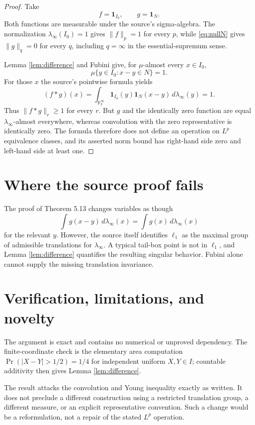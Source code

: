 \documentclass[11pt]{article}
\newcommand{\R}{\mathbb R}
\begin{document}
\begin{proof}
Take
\[
 f=\mathbf1_{I_0},\qquad g=\mathbf1_N.
\]
Both functions are measurable under the source's sigma-algebra.  The
normalization $\lambda_\infty(I_0)=1$ gives $\|f\|_p=1$ for every $p$, while
\eqref{eq:nullN} gives $\|g\|_q=0$ for every $q$, including $q=\infty$ in the
essential-supremum sense.

Lemma \ref{lem:difference} and Fubini give, for $\mu$-almost every $x\in I_0$,
\[
 \mu\{y\in I_0:x-y\in N\}=1.
\]
For those $x$ the source's pointwise formula yields
\[
 (f*g)(x)
 =\int_{\R_I^\infty}\mathbf1_{I_0}(y)\mathbf1_N(x-y)
   \,d\lambda_\infty(y)
 =1.
\]
Thus $\|f*g\|_r\geq1$ for every $r$.  But $g$ and the identically zero
function are equal $\lambda_\infty$-almost everywhere, whereas convolution
with the zero representative is identically zero.  The formula therefore
does not define an operation on $L^p$ equivalence classes, and its asserted
norm bound has right-hand side zero and left-hand side at least one.
\end{proof}

\section{Where the source proof fails}
The proof of Theorem 5.13 changes variables as though
\[
 \int g(x-y)\,d\lambda_\infty(x)=\int g(x)\,d\lambda_\infty(x)
\]
for the relevant $y$.  However, the source itself identifies $\ell_1$ as the
maximal group of admissible translations for $\lambda_\infty$.  A typical
tail-box point is not in $\ell_1$, and Lemma \ref{lem:difference} quantifies
the resulting singular behavior.  Fubini alone cannot supply the missing
translation invariance.

\section{Verification, limitations, and novelty}
The argument is exact and contains no numerical or unproved dependency.  The
finite-coordinate check is the elementary area computation
$\Pr(|X-Y|>1/2)=1/4$ for independent uniform $X,Y\in I$; countable additivity
then gives Lemma \ref{lem:difference}.

The result attacks the convolution and Young inequality exactly as written.
It does not preclude a different construction using a restricted translation
group, a different measure, or an explicit representative convention.  Such
a change would be a reformulation, not a repair of the stated $L^p$ operation.
\end{document}
